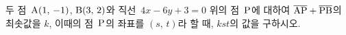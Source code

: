 두 점~$\mathrm{A}(1,\,-1)$, $\mathrm{B}(3,\,2)$와 직선~$4x-6y+3=0$ 위의 점~$\mathrm{P}$에 대하여 $\overline{\mathrm{AP}}+\overline{\mathrm{PB}}$의 최솟값을 $k$, 이때의 점~$\mathrm{P}$의 좌표를 $(s,\,t)$라 할 때, $kst$의 값을 구하시오.
